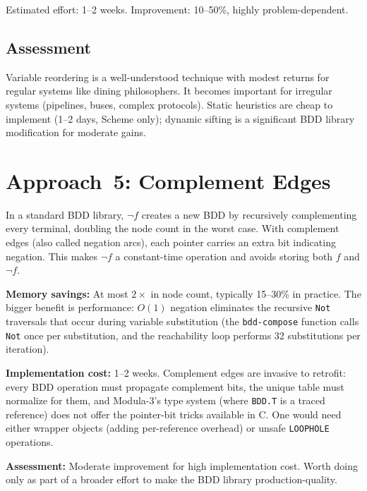 \documentclass[11pt]{article}
\begin{document}
Estimated effort: 1--2 weeks.  Improvement: 10--50\%, highly
problem-dependent.

\subsection{Assessment}

Variable reordering is a well-understood technique with modest
returns for regular systems like dining philosophers.  It becomes
important for irregular systems (pipelines, buses, complex protocols).
Static heuristics are cheap to implement (1--2 days, Scheme only);
dynamic sifting is a significant BDD library modification for
moderate gains.

\section{Approach~5: Complement Edges}

In a standard BDD library, $\neg f$ creates a new BDD by
recursively complementing every terminal, doubling the node count
in the worst case.  With complement edges (also called negation arcs),
each pointer carries an extra bit indicating negation.  This makes
$\neg f$ a constant-time operation and avoids storing both $f$ and
$\neg f$.

\textbf{Memory savings:}  At most $2\times$ in node count, typically
15--30\% in practice.  The bigger benefit is performance: $O(1)$
negation eliminates the recursive \texttt{Not} traversals that occur
during variable substitution (the \texttt{bdd-compose} function calls
\texttt{Not} once per substitution, and the reachability loop
performs 32 substitutions per iteration).

\textbf{Implementation cost:}  1--2 weeks.  Complement edges are
invasive to retrofit: every BDD operation must propagate complement
bits, the unique table must normalize for them, and Modula-3's
type system (where \texttt{BDD.T} is a traced reference) does not
offer the pointer-bit tricks available in C.  One would need either
wrapper objects (adding per-reference overhead) or unsafe
\texttt{LOOPHOLE} operations.

\textbf{Assessment:}  Moderate improvement for high implementation
cost.  Worth doing only as part of a broader effort to make the BDD
library production-quality.
\end{document}
